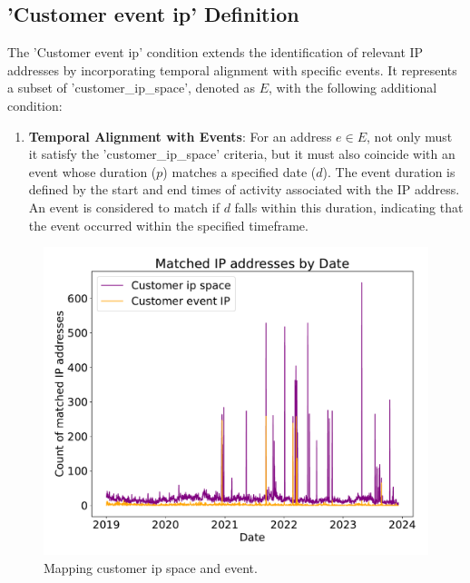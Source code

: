 \subsection*{'Customer event ip' Definition}

The 'Customer event ip' condition extends the identification of relevant IP addresses by incorporating temporal alignment with specific events. It represents a subset of 'customer\_ip\_space', denoted as $E$, with the following additional condition:

\begin{enumerate}
    \item \textbf{Temporal Alignment with Events}: For an address $e \in E$, not only must it satisfy the 'customer\_ip\_space' criteria, but it must also coincide with an event whose duration ($p$) matches a specified date ($d$). The event duration is defined by the start and end times of activity associated with the IP address. An event is considered to match if $d$ falls within this duration, indicating that the event occurred within the specified timeframe.
\end{enumerate}


\begin{figure}[htbp]
    \centering
    \includegraphics[scale=0.30]{graphs/matched_customer_graph.pdf}
    \caption{Mapping customer ip space and event.}
    \label{fig:mappedcustomergraph}
    \end{figure}

